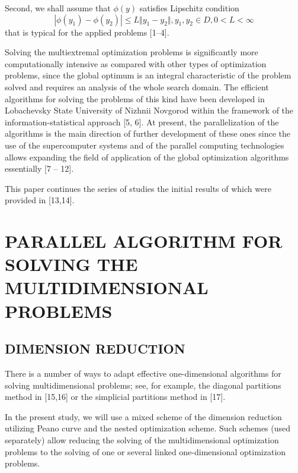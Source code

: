 \documentclass{aip-cp}
\begin{document}
Second, we shall assume that $\phi(y)$ satisfies Lipschitz condition
\begin{displaymath}
|\phi(y_1)-\phi(y_2)|\leqslant L\Vert y_1-y_2\Vert,y_1,y_2\in D,0<L<\infty
\end{displaymath}
that is typical for the applied problems [1–4].

Solving the multiextremal optimization problems is significantly more computationally intensive as compared with other types of optimization problems, since the global optimum is an integral characteristic of the problem solved and requires an analysis of the whole search domain. The efficient algorithms for solving the problems of this kind have been developed in Lobachevsky State University of Nizhnii Novgorod within the framework of the information-statistical approach [5, 6]. At present, the parallelization of the algorithms is the main direction of further development of these ones since the use of the supercomputer systems and of the parallel computing technologies allows expanding the field of application of the global optimization algorithms essentially [7 – 12].

This paper continues the series of studies the initial results of which were provided in [13,14].

\section{PARALLEL ALGORITHM FOR SOLVING THE MULTIDIMENSIONAL PROBLEMS}

\subsection{DIMENSION REDUCTION}
There is a number of ways to adapt effective one-dimensional algorithms for solving multidimensional problems; see, for example, the diagonal partitions method in [15,16] or the simplicial partitions method in [17]. 

In the present study, we will use a mixed scheme of the dimension reduction utilizing Peano curve and the nested optimization scheme. Such schemes (used separately) allow reducing the solving of the multidimensional optimization problems to the solving of one or several linked one-dimensional optimization problems.
\end{document}
